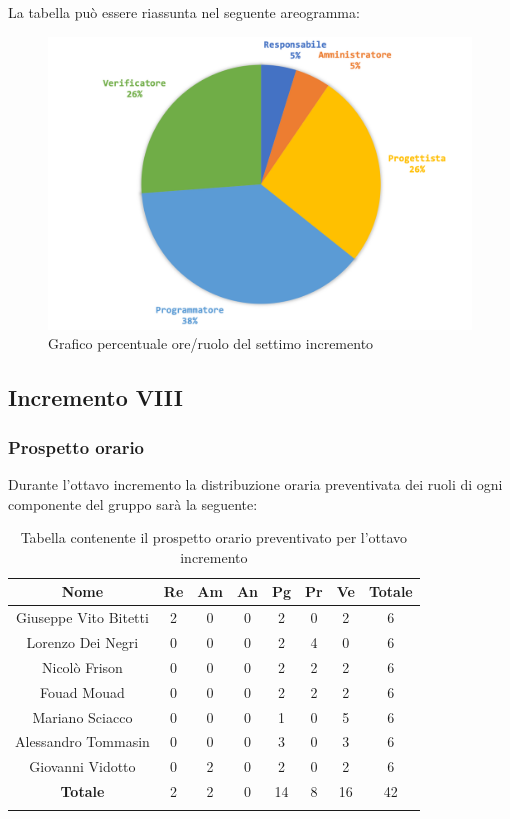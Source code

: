 		La tabella può essere riassunta nel seguente areogramma:
		\begin{figure}[H]
			\centering
			\includegraphics[width=0.8\linewidth]{./images/preventivo/incremento7-2.png}
			\caption{Grafico percentuale ore/ruolo del settimo incremento}
			\label{fig:grafico costi ruolo incremento VII}
		\end{figure}
		
		
		\subsection{Incremento VIII}
		\subsubsection{Prospetto orario}
		Durante l'ottavo incremento la distribuzione oraria preventivata dei ruoli di ogni componente del gruppo sarà la seguente:
		
		\begin{longtable}{|c|c|c|c|c|c|c|c|}
			\hline
			\rowcolor{lighter-grayer}
			\textbf{Nome} & \textbf{Re} & \textbf{Am} & \textbf{An} & \textbf{Pg}  & \textbf{Pr}   & \textbf{Ve} & \textbf{Totale} \\
			\hline
			\endfirsthead
			
			\hline
			Giuseppe Vito Bitetti 		 & 2 & 0 & 0 & 2 & 0 & 2 & 6\\
			\hline
			\hline
			Lorenzo Dei Negri			 & 0 & 0 & 0 & 2 & 4 & 0 & 6\\
			\hline
			\hline
			Nicolò Frison				      & 0 & 0 & 0 & 2 & 2 & 2 & 6\\
			\hline
			\hline
			Fouad Mouad 				   & 0 & 0 & 0 & 2 & 2 & 2 & 6\\
			\hline
			\hline
			Mariano Sciacco 			 & 0 & 0 & 0 & 1 & 0 & 5 & 6\\
			\hline
			\hline
			Alessandro Tommasin    & 0 & 0 & 0 & 3 & 0 & 3 & 6\\
			\hline
			\hline
			Giovanni Vidotto 			  & 0 & 2 & 0 & 2 & 0 & 2 & 6\\
			\hline 
			\textbf{Totale}			 		 & 2 & 2 & 0 & 14 & 8 & 16 & 42\\
			\hline
			\caption{Tabella contenente il prospetto orario preventivato per l'ottavo incremento}
		\end{longtable}
		\pagebreak
		
